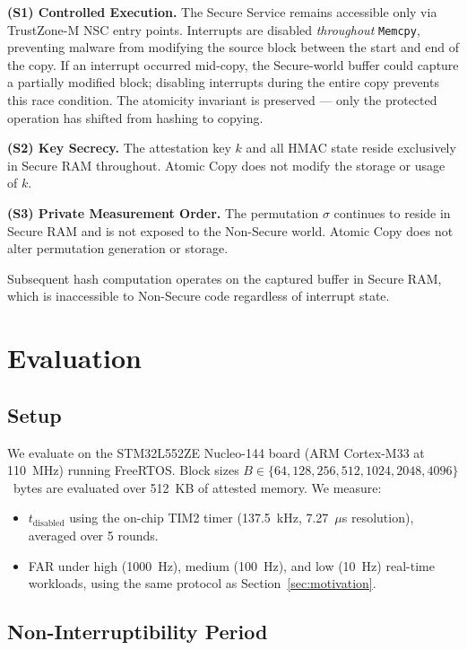 \documentclass[conference]{IEEEtran}
\newcommand{\tdis}{$t_{\mathrm{disabled}}$\xspace}
\newcommand{\FAR}{FAR\xspace}
\begin{document}
\textbf{(S1) Controlled Execution.} The Secure Service remains
accessible only via TrustZone-M NSC entry points. Interrupts are
disabled \emph{throughout} \texttt{Memcpy}, preventing malware from
modifying the source block between the start and end of the copy.
If an interrupt occurred mid-copy, the Secure-world buffer could
capture a partially modified block; disabling interrupts during the
entire copy prevents this race condition. The atomicity invariant
is preserved — only the protected operation has shifted from
hashing to copying.
 
\textbf{(S2) Key Secrecy.} The attestation key $k$ and all
HMAC state reside exclusively in Secure RAM throughout.
Atomic Copy does not modify the storage or usage of $k$.
 
\textbf{(S3) Private Measurement Order.} The permutation $\sigma$
continues to reside in Secure RAM and is not exposed to the
Non-Secure world. Atomic Copy does not alter permutation
generation or storage.
 
Subsequent hash computation operates on the captured buffer in
Secure RAM, which is inaccessible to Non-Secure code regardless
of interrupt state.

\section{Evaluation}
\label{sec:eval}

\subsection{Setup}

We evaluate on the STM32L552ZE Nucleo-144 board (ARM Cortex-M33
at 110~MHz) running FreeRTOS. Block sizes
$B \in \{64, 128, 256, 512, 1024, 2048, 4096\}$~bytes are evaluated
over 512~KB of attested memory. We measure:
\begin{itemize}
  \item \tdis using the on-chip TIM2 timer (137.5~kHz,
    7.27~$\mu$s resolution), averaged over 5 rounds.
  \item \FAR under high (1000~Hz), medium (100~Hz), and low (10~Hz)
    real-time workloads, using the same protocol as
    Section~\ref{sec:motivation}.
\end{itemize}

\subsection{Non-Interruptibility Period}
\end{document}
